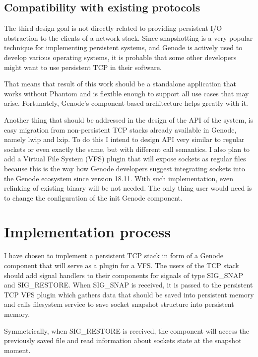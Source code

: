 \subsection {Compatibility with existing protocols}

The third design goal is not directly related to providing persistent I/O
abstraction to the clients of a network stack. Since snapshotting is a very
popular technique for implementing persistent systems, and Genode is actively
used to develop various operating systems, it is probable that some other
developers might want to use persistent TCP in their software.

That means that result of this work should be a standalone application that
works without Phantom and is flexible enough to support all use cases that may
arise. Fortunately, Genode's component-based architecture helps greatly with
it.

Another thing that should be addressed in the design of the API of the system,
is easy migration from non-persistent TCP stacks already available in Genode,
namely lwip and lxip. To do this I intend to design API very similar to regular
sockets or even exactly the same, but with different call semantics. I also
plan to add a Virtual File System (VFS) plugin that will expose sockets as
regular files because this is the way how Genode developers suggest
integrating sockets into the Genode ecosystem since version 18.11. With such
implementation, even relinking of existing binary will be not needed. The only
thing user would need is to change the configuration of the init Genode
component.

\section{Implementation process}

I have chosen to implement a persistent TCP stack in form of a Genode component
that will serve as a plugin for a VFS. The users of the TCP stack should add
signal handlers to their components for signals of type SIG\_SNAP and
SIG\_RESTORE. When SIG\_SNAP is received, it is passed to the persistent TCP VFS
plugin which gathers data that should be saved into persistent memory and calls
filesystem service to save socket snapshot structure into persistent memory.

Symmetrically, when SIG\_RESTORE is received, the component will access the
previously saved file and read information about sockets state at the snapshot
moment.

